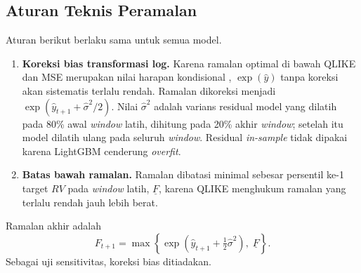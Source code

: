 \subsection{Aturan Teknis Peramalan}
\label{subsec:teknis}
Aturan berikut berlaku sama untuk semua model.
\begin{enumerate}
  \item \textbf{Koreksi bias transformasi log.} Karena ramalan optimal di
        bawah QLIKE dan MSE merupakan nilai harapan kondisional
        \cite{patton2011}, $\exp(\hat y)$ tanpa koreksi akan sistematis
        terlalu rendah. Ramalan dikoreksi menjadi
        $\exp(\hat y_{t+1} + \hat\sigma^2/2)$. Nilai $\hat\sigma^2$ adalah
        varians residual model yang dilatih pada 80\% awal \textit{window}
        latih, dihitung pada 20\% akhir \textit{window}; setelah itu model
        dilatih ulang pada seluruh \textit{window}. Residual
        \textit{in-sample} tidak dipakai karena LightGBM cenderung
        \textit{overfit}.
  \item \textbf{Batas bawah ramalan.} Ramalan dibatasi minimal sebesar
        persentil ke-1 target $RV$ pada \textit{window} latih,
        $\underline{F}$, karena QLIKE menghukum ramalan yang terlalu rendah
        jauh lebih berat.
\end{enumerate}

Ramalan akhir adalah
\begin{equation}
  F_{t+1} = \max\!\left\{
    \exp\!\left(\hat y_{t+1} + \tfrac{1}{2}\hat\sigma^2\right),\;
    \underline{F} \right\}.
  \label{eq:ramalan}
\end{equation}
Sebagai uji sensitivitas, koreksi bias ditiadakan.

